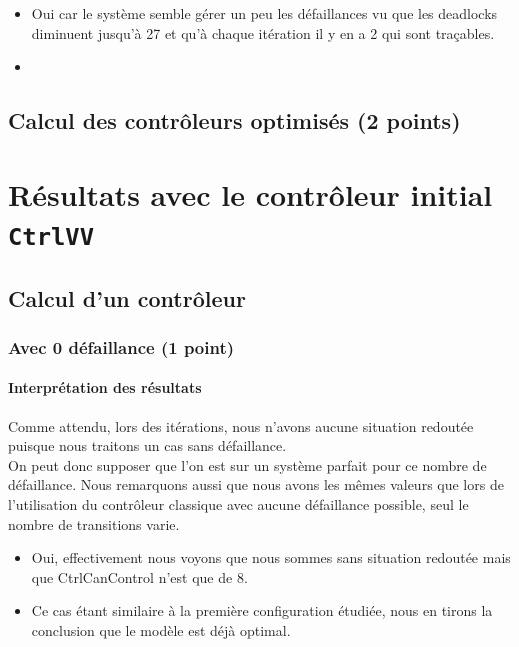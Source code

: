 \documentclass[a4paper]{book}
\begin{document}
\begin{itemize}
	\item Oui car le système semble gérer un peu les défaillances vu que les deadlocks diminuent jusqu'à 27 et qu'à chaque itération il y en a 2 qui sont traçables.
	\item 
\end{itemize}

\subsection{Calcul des contrôleurs optimisés (2 points)}

\section{Résultats avec le contrôleur initial {\tt CtrlVV}}

\subsection{Calcul d'un contrôleur}

\subsubsection{Avec 0 défaillance (1 point)}





\paragraph{Interprétation des résultats}

Comme attendu, lors des itérations, nous n'avons aucune situation redoutée puisque nous traitons un cas sans défaillance. \\ 
On peut donc supposer que l'on est sur un système parfait pour ce nombre de défaillance. Nous remarquons aussi que nous avons les mêmes valeurs que lors de l'utilisation du contrôleur classique avec aucune défaillance possible, seul le nombre de transitions varie.

\begin{itemize}
	\item Oui, effectivement nous voyons que nous sommes sans situation redoutée mais que CtrlCanControl n'est que de 8.
	\item Ce cas étant similaire à la première configuration étudiée, nous en tirons la conclusion que le modèle est déjà optimal.
\end{itemize}
\end{document}
